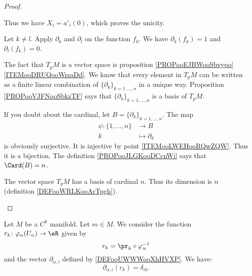 \begin{proof}
\begin{subproof}
		Thus we have \( X_i=a'_i(0)\), which proves the unicity.

		Let \( k\neq l\). Apply \( \partial_k\) and \( \partial_l\) on the function \( f_k\). We have \( \partial_k(f_k)=1\) and \( \partial_l(f_k)=0\).

		The fact that \( T_pM\) is a vector space is proposition \ref{PROPooEJBWooSbvypo}\ref{ITEMooDRUQooWrsaDd}. We know that every element in \( T_pM\) can be written as a finite linear combination of \( \{ \partial_k \}_{k=1,\ldots,n}\) in a unique way. Proposition \ref{PROPooVJFNooSbkzTF} says that \( \{ \partial_k \}_{k=1,\ldots,n}\) is a basis of \( T_pM\).


		If you doubt about the cardinal, let \( B=\{ \partial_k \}_{k=1,\ldots,n} \). The map
		\begin{equation}
			\begin{aligned}
				\psi\colon \{ 1,\ldots,n \} & \to B              \\
				k                           & \mapsto \partial_k
			\end{aligned}
		\end{equation}
		is obviously surjective. It is injective by point \ref{ITEMooLWEHooRQwZQW}. Thus it is a bijection. The definition \ref{PROPooJLGKooDCcnWi} says that \( \Card(B)=n\).

		The vector space \( T_pM\) has a basis of cardinal \( n\). Thus its dimension is \( n\) (definition \ref{DEFooWRLKooArTpgh}).
	\end{subproof}
\end{proof}

\begin{lemma}	\label{LEMooBFKIooSPRxZJ}
	Let \( M\) be a \( C^k\) manifold. Let \( m\in M\). We consider the function \(r_k \colon \varphi_{\alpha}(U_{\alpha})\to \eR  \) given by
	\begin{equation}
		r_k=\pr_k\circ \varphi_{\alpha}^{-1}
	\end{equation}
	and the vector \( \partial_{\alpha,i}\) defined by \ref{DEFooUWWWooXhHVXP}. We have:
	\begin{equation}
		\partial_{\alpha,i}(r_k)=\delta_{ik}.
	\end{equation}
\end{lemma}

